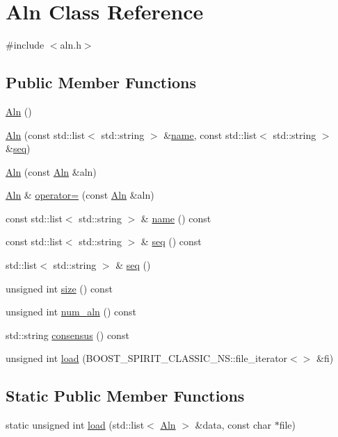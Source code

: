 \hypertarget{class_aln}{\section{Aln Class Reference}
\label{class_aln}
}


{\ttfamily \#include $<$aln.\+h$>$}

\subsection*{Public Member Functions}
\begin{DoxyCompactItemize}
\item 
\hyperlink{class_aln_afb7059e932712d6d0a61857dd592c967}{Aln} ()
\item 
\hyperlink{class_aln_a97b368aa74831205e5abd35b39eaf647}{Aln} (const std\+::list$<$ std\+::string $>$ \&\hyperlink{class_aln_a1ab21509801bad54f735c9fd547c0a04}{name}, const std\+::list$<$ std\+::string $>$ \&\hyperlink{class_aln_a07ac4d997bee9b73c5d2da5fd8e0102a}{seq})
\item 
\hyperlink{class_aln_a481e0dab2dd462a6e277ad3b3982df12}{Aln} (const \hyperlink{class_aln}{Aln} \&aln)
\item 
\hyperlink{class_aln}{Aln} \& \hyperlink{class_aln_a75e300214412b357d6d382a807834d0a}{operator=} (const \hyperlink{class_aln}{Aln} \&aln)
\item 
const std\+::list$<$ std\+::string $>$ \& \hyperlink{class_aln_a1ab21509801bad54f735c9fd547c0a04}{name} () const 
\item 
const std\+::list$<$ std\+::string $>$ \& \hyperlink{class_aln_a07ac4d997bee9b73c5d2da5fd8e0102a}{seq} () const 
\item 
std\+::list$<$ std\+::string $>$ \& \hyperlink{class_aln_ab34086c2018b34082b10603eb8607a99}{seq} ()
\item 
unsigned int \hyperlink{class_aln_a2e473685aac8dc4c5bf58a2013254907}{size} () const 
\item 
unsigned int \hyperlink{class_aln_ababa37dc4967c06b20c4af1b7a42a789}{num\+\_\+aln} () const 
\item 
std\+::string \hyperlink{class_aln_a45fb6b8dcfcf254836bacabbbebe4ce8}{consensus} () const 
\item 
unsigned int \hyperlink{class_aln_a5fcc6e25e01d0cbb7fba486d0d1ee66b}{load} (B\+O\+O\+S\+T\+\_\+\+S\+P\+I\+R\+I\+T\+\_\+\+C\+L\+A\+S\+S\+I\+C\+\_\+\+N\+S\+::file\+\_\+iterator$<$$>$ \&fi)
\end{DoxyCompactItemize}
\subsection*{Static Public Member Functions}
\begin{DoxyCompactItemize}
\item 
static unsigned int \hyperlink{class_aln_a4e7552a5bf54c3a7304fd2d4ca5a14e2}{load} (std\+::list$<$ \hyperlink{class_aln}{Aln} $>$ \&data, const char $\ast$file)
\end{DoxyCompactItemize}


